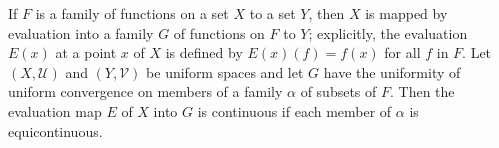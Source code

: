 If $F$ is a family of functions on a set $X$ to a set $Y$, then $X$ is mapped by evaluation into a family $G$ of functions on $F$ to $Y$; explicitly, the evaluation $E(x)$ at a point $x$ of $X$ is defined by $E(x)(f) = f(x)$ for all $f$ in $F$. Let $(X, \mathcal{U})$ and $(Y, \mathcal{V})$ be uniform spaces and let $G$ have the uniformity of uniform convergence on members of a family $\alpha$ of subsets of $F$. Then the evaluation map $E$ of $X$ into $G$ is continuous if each member of $\alpha$ is equicontinuous.
